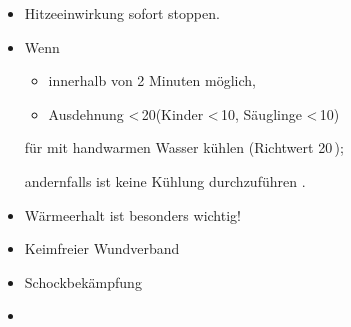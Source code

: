 \label{m:verbrennung-eh}
\begin{itemize}
  \item Hitzeeinwirkung sofort stoppen.
  \item Wenn 
  \begin{itemize}
    \item innerhalb von 2 Minuten
  möglich,
    \item Ausdehnung <\,20\PC* (Kinder <\,10\PC, Säuglinge
    <\,10\PC*) 
  \end{itemize}  für  mit
    handwarmen Wasser kühlen (Richtwert 20\,\DegC); 
    
    andernfalls ist keine Kühlung durchzuführen
  \cite{Asanger2010,ASBOEAkademieUpdate2010Verbrennung}.
  
  \item Wärmeerhalt ist besonders wichtig!
  \item Keimfreier Wundverband
  \item Schockbekämpfung
  \item {}
\end{itemize}